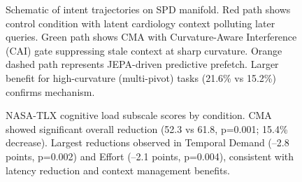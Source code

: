 \begin{figure}[htbp]
\begin{tikzpicture}[scale=1.0]
  \end{tikzpicture}
  \caption{Schematic of intent trajectories on SPD manifold. Red path shows control condition with latent cardiology context polluting later queries. Green path shows CMA with Curvature-Aware Interference (CAI) gate suppressing stale context at sharp curvature. Orange dashed path represents JEPA-driven predictive prefetch. Larger benefit for high-curvature (multi-pivot) tasks (21.6\% vs 15.2\%) confirms mechanism.}
  \label{fig:intent_trajectory}
\end{figure}

\begin{figure}[htbp]
  \centering
  \caption{NASA-TLX cognitive load subscale scores by condition. CMA showed significant overall reduction (52.3 vs 61.8, p=0.001; 15.4\% decrease). Largest reductions observed in Temporal Demand (–2.8 points, p=0.002) and Effort (–2.1 points, p=0.004), consistent with latency reduction and context management benefits.}
  \label{fig:tlx}
\end{figure}

